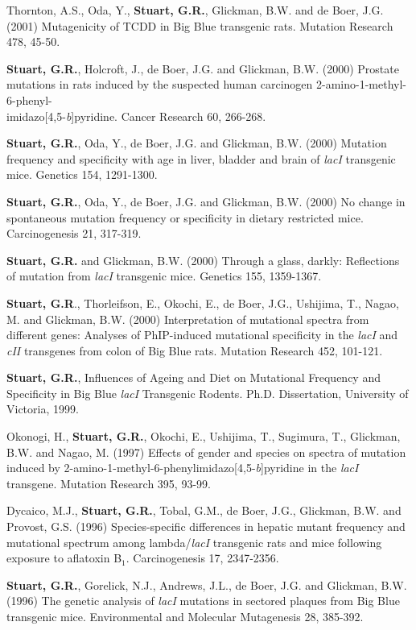 \documentclass[margin]{res} %
\begin{document}
\begin{resume}
Thornton, A.S., Oda, Y., \textbf{Stuart, G.R.}, Glickman, B.W. and de Boer, J.G. (2001) Mutagenicity of TCDD in Big  Blue\textsuperscript{\textregistered} transgenic rats. Mutation Research 478, 45-50.

\textbf{Stuart, G.R.}, Holcroft, J., de Boer, J.G. and Glickman, B.W. (2000) Prostate mutations in rats induced by the suspected human carcinogen 2-amino-1-methyl-6-phenyl-\\imidazo[4,5-\textit{b}]pyridine. Cancer Research 60, 266-268.

\textbf{Stuart, G.R.}, Oda, Y., de Boer, J.G. and Glickman, B.W. (2000) Mutation frequency and specificity with age in liver, bladder and brain of \textit{lacI} transgenic mice. Genetics 154, 1291-1300.

\textbf{Stuart, G.R.}, Oda, Y., de Boer, J.G. and Glickman, B.W. (2000) No change in spontaneous mutation frequency or specificity in dietary restricted mice. Carcinogenesis 21, 317-319.

\textbf{Stuart, G.R.} and Glickman, B.W. (2000) Through a glass, darkly: Reflections of mutation from \textit{lacI} transgenic mice. Genetics 155, 1359-1367.

\textbf{Stuart, G.R}., Thorleifson, E., Okochi, E., de Boer, J.G., Ushijima, T., Nagao, M. and Glickman, B.W. (2000) Interpretation of mutational spectra from different genes: Analyses of PhIP-induced mutational specificity in the \textit{lacI} and \textit{cII} transgenes from colon of Big  Blue\textsuperscript{\textregistered} rats. Mutation Research  452, 101-121.

\textbf{Stuart, G.R.}, Influences of Ageing and Diet on Mutational Frequency and Specificity in Big  Blue\textsuperscript{\textregistered} \textit{lacI} Transgenic Rodents. Ph.D. Dissertation, University of Victoria, 1999.

Okonogi, H., \textbf{Stuart, G.R.}, Okochi, E., Ushijima, T., Sugimura, T., Glickman, B.W. and Nagao, M. (1997) Effects of gender and species on spectra of mutation induced by 2-amino-1-methyl-6-phenylimidazo[4,5-\textit{b}]pyridine in the \textit{lacI} transgene. Mutation Research 395, 93-99.

Dycaico, M.J., \textbf{Stuart, G.R.}, Tobal, G.M., de Boer, J.G., Glickman, B.W. and Provost, G.S. (1996) Species-specific differences in hepatic mutant frequency and mutational spectrum among lambda/\textit{lacI} transgenic rats and mice following exposure to aflatoxin B$_{1}$. Carcinogenesis 17, 2347-2356.

\textbf{Stuart, G.R.}, Gorelick, N.J., Andrews, J.L., de Boer, J.G. and Glickman, B.W. (1996) The genetic analysis of \textit{lacI} mutations in sectored plaques from Big  Blue\textsuperscript{\textregistered} transgenic mice. Environmental and Molecular Mutagenesis 28, 385-392.


\end{resume}
\end{document}
